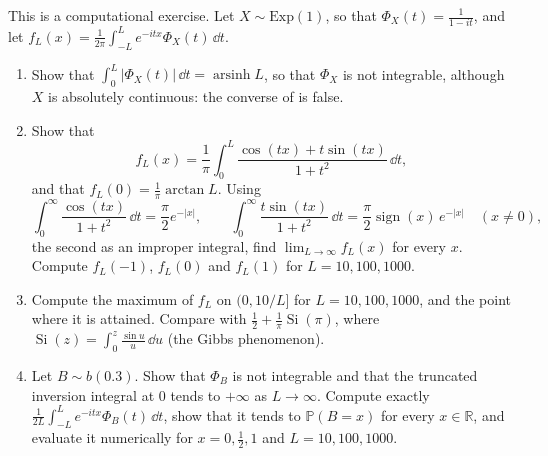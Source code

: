 \begin{exercise}\label{ex:cf-non-integrable}
\hard This is a computational exercise. Let $X\sim\mathrm{Exp}(1)$, so that
$\Phi_X(t)=\frac1{1-it}$, and let
$f_L(x)=\frac1{2\pi}\int_{-L}^Le^{-itx}\Phi_X(t)\,\dd t$.
\begin{enumerate}[label=(\alph*)]
  \item Show that $\int_0^L|\Phi_X(t)|\,\dd t=\operatorname{arsinh}L$, so that $\Phi_X$ is not
    integrable, although $X$ is absolutely continuous: the converse of
     is false.
  \item Show that
    \[
      f_L(x)=\frac1\pi\int_0^L\frac{\cos(tx)+t\sin(tx)}{1+t^2}\,\dd t,
    \]
    and that $f_L(0)=\frac1\pi\arctan L$. Using
    \[
      \int_0^\infty\frac{\cos(tx)}{1+t^2}\,\dd t=\frac\pi2e^{-|x|},\qquad
      \int_0^\infty\frac{t\sin(tx)}{1+t^2}\,\dd t=\frac\pi2\operatorname{sign}(x)\,e^{-|x|}\quad(x\ne0),
    \]
    the second as an improper integral, find $\lim_{L\to\infty}f_L(x)$ for every $x$. Compute
    $f_L(-1)$, $f_L(0)$ and $f_L(1)$ for $L=10,100,1000$.
  \item Compute the maximum of $f_L$ on $(0,10/L]$ for $L=10,100,1000$, and the point where it is
    attained. Compare with $\frac12+\frac1\pi\operatorname{Si}(\pi)$, where
    $\operatorname{Si}(z)=\int_0^z\frac{\sin u}u\,\dd u$ (the Gibbs phenomenon).
  \item Let $B\sim b(0.3)$. Show that $\Phi_B$ is not integrable and that the truncated inversion
    integral at $0$ tends to $+\infty$ as $L\to\infty$. Compute exactly
    $\frac1{2L}\int_{-L}^Le^{-itx}\Phi_B(t)\,\dd t$, show that it tends to $\mathbb P(B=x)$ for every
    $x\in\mathbb R$, and evaluate it numerically for $x=0,\frac12,1$ and $L=10,100,1000$.
\end{enumerate}
\end{exercise}
